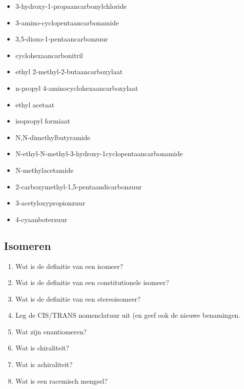 \documentclass[a4paper,12pt]{article}
\begin{document}
\begin{enumerate}
\begin{enumerate}
\begin{itemize}
                    \item 3-hydroxy-1-propaancarbonylchloride
                    \item 3-amino-cyclopentaancarbonamide
                    \item 3,5-dioxo-1-pentaancarbonzuur
                    \item cyclohexaancarbonitril
                    \item ethyl 2-methyl-2-butaancarboxylaat
                    \item n-propyl 4-aminocyclohexaancarboxylaat
                    \item ethyl acetaat
                    \item isopropyl formiaat
                    \item N,N-dimethylbutyramide
                    \item N-ethyl-N-methyl-3-hydroxy-1cyclopentaancarbonamide
                    \item N-methylacetamide
                    \item 2-carboxymethyl-1,5-pentaandicarbonzuur
                    \item 3-acetyloxypropionzuur
                    \item 4-cyaanboterzuur
                \end{itemize}
        \end{enumerate}
    \end{enumerate}

    \subsection*{Isomeren}
    \begin{enumerate}
	    \item Wat is de definitie van een isomeer?
	    \item Wat is de definitie van een constitutionele isomeer?
	    \item Wat is de definitie van een stereoisomeer?
	    \item Leg de CIS/TRANS nomenclatuur uit (en geef ook de nieuwe benamingen.
	    \item Wat zijn enantiomeren?
	    \item Wat is chiraliteit?
	    \item Wat is achiraliteit?
	    \item Wat is een racemisch mengsel?
    \end{enumerate}
\end{document}
